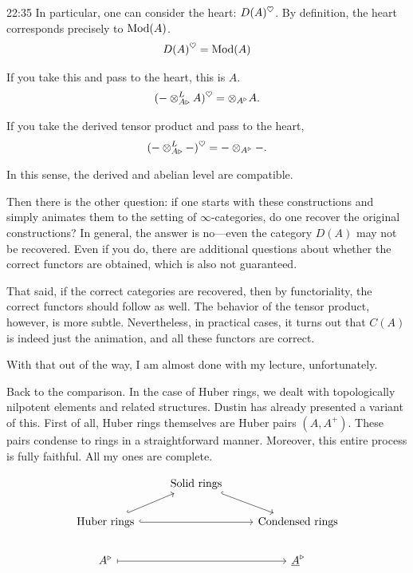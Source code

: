 \begin{unfinished}{22:35}
In particular, one can consider the heart: $D(A)^{\mathrm{\heartsuit}}$. By definition, the heart corresponds precisely to $\operatorname{Mod}(A)$.
\begin{align*}
D(A)^{\mathrm{\heartsuit}} = \operatorname{Mod}(A)
\end{align*}

If you take this and pass to the heart, this is $A$. 
\begin{align*}
(-\otimes^L_{A\triangleright} A)^{\mathrm{\heartsuit}} = \otimes_{A^\triangleright} A.
\end{align*}

If you take the derived tensor product and pass to the heart,
\begin{align*}
(-\otimes^L_{A\triangleright}-)^{\mathrm{\heartsuit}} = - \otimes_{A^\triangleright} -.
\end{align*}

In this sense, the derived and abelian level are compatible.

Then there is the other question: if one starts with these constructions and simply animates them to the setting of $\infty$-categories, do one recover the original constructions? 
In general, the answer is no---even the category $D(A)$ may not be recovered. 
Even if you do, there are additional questions about whether the correct functors are obtained, which is also not guaranteed. 


That said, if the correct categories are recovered, then by functoriality, the correct functors should follow as well.
The behavior of the tensor product, however, is more subtle. Nevertheless, in practical cases, it turns out that $C(A)$ is indeed just the animation, and all these functors are correct.

With that out of the way, I am almost done with my lecture, unfortunately.

%
Back to the comparison. 
In the case of Huber rings, we dealt with topologically nilpotent elements and related structures. Dustin has already presented a variant of this.
First of all, Huber rings themselves are Huber pairs $(A, A^+)$. These pairs condense to rings in a straightforward manner. 
Moreover, this entire process is fully faithful. All my ones are complete. 

\[\begin{tikzcd}
	& {\text{Solid rings}} \\
	{\text{Huber rings}} && {\text{Condensed rings}} \\
	{A^\tri} && {\underline{A}^\tri}
	\arrow[hook, from=1-2, to=2-3]
	\arrow[hook, from=2-1, to=1-2]
	\arrow[hook, from=2-1, to=2-3]
	\arrow[maps to, from=3-1, to=3-3]
\end{tikzcd}\]


\end{unfinished}
